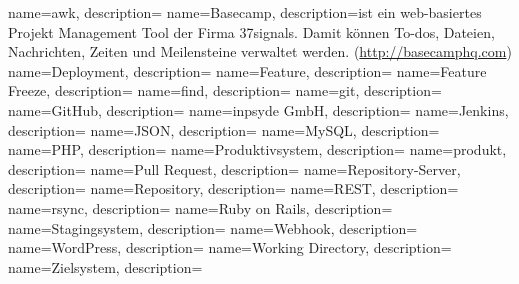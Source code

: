  {
  name=awk,
  description={}
}
 {
  name=Basecamp,
  description={ist ein web-basiertes Projekt Management Tool der Firma 37signals. Damit können To-dos, Dateien, Nachrichten, Zeiten und Meilensteine verwaltet werden. (\url{http://basecamphq.com})}
}
 {
  name=Deployment,
  description={}
}
 {
  name=Feature,
  description={}
}
 {
  name=Feature Freeze,
  description={}
}
 {
  name=find,
  description={}
}
 {
  name=git,
  description={}
}
 {
  name=GitHub,
  description={}
}
 {
  name=inpsyde GmbH,
  description={}
}
 {
  name=Jenkins,
  description={}
}
 {
  name=JSON,
  description={}
}
 {
  name=MySQL,
  description={}
}
 {
  name=PHP,
  description={}
}
 {
  name=Produktivsystem,
  description={}
}
 {
  name=produkt,
  description={}
}
 {
  name=Pull Request,
  description={}
}
 {
  name=Repository-Server,
  description={}
}
 {
  name=Repository,
  description={}
}
 {
  name=REST,
  description={}
}
 {
  name=rsync,
  description={}
}
 {
  name=Ruby on Rails,
  description={}
}
 {
  name=Stagingsystem,
  description={}
}
 {
  name=Webhook,
  description={}
}
 {
  name=WordPress,
  description={}
}
 {
  name=Working Directory,
  description={}
}
 {
  name=Zielsystem,
  description={}
}


\makeglossaries
